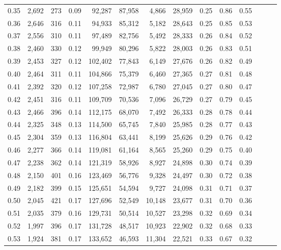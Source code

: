 \begin{tabular}{rrrrrrrrrrrrrr}
0.35 &  2,692 &  273 &  0.09 &   92,287 &   87,958 &   4,866 &  28,959 &  0.25 &  0.86 &      0.55 \\
0.36 &  2,646 &  316 &  0.11 &   94,933 &   85,312 &   5,182 &  28,643 &  0.25 &  0.85 &      0.53 \\
0.37 &  2,556 &  310 &  0.11 &   97,489 &   82,756 &   5,492 &  28,333 &  0.26 &  0.84 &      0.52 \\
0.38 &  2,460 &  330 &  0.12 &   99,949 &   80,296 &   5,822 &  28,003 &  0.26 &  0.83 &      0.51 \\
0.39 &  2,453 &  327 &  0.12 &  102,402 &   77,843 &   6,149 &  27,676 &  0.26 &  0.82 &      0.49 \\
0.40 &  2,464 &  311 &  0.11 &  104,866 &   75,379 &   6,460 &  27,365 &  0.27 &  0.81 &      0.48 \\
0.41 &  2,392 &  320 &  0.12 &  107,258 &   72,987 &   6,780 &  27,045 &  0.27 &  0.80 &      0.47 \\
0.42 &  2,451 &  316 &  0.11 &  109,709 &   70,536 &   7,096 &  26,729 &  0.27 &  0.79 &      0.45 \\
0.43 &  2,466 &  396 &  0.14 &  112,175 &   68,070 &   7,492 &  26,333 &  0.28 &  0.78 &      0.44 \\
0.44 &  2,325 &  348 &  0.13 &  114,500 &   65,745 &   7,840 &  25,985 &  0.28 &  0.77 &      0.43 \\
0.45 &  2,304 &  359 &  0.13 &  116,804 &   63,441 &   8,199 &  25,626 &  0.29 &  0.76 &      0.42 \\
0.46 &  2,277 &  366 &  0.14 &  119,081 &   61,164 &   8,565 &  25,260 &  0.29 &  0.75 &      0.40 \\
0.47 &  2,238 &  362 &  0.14 &  121,319 &   58,926 &   8,927 &  24,898 &  0.30 &  0.74 &      0.39 \\
0.48 &  2,150 &  401 &  0.16 &  123,469 &   56,776 &   9,328 &  24,497 &  0.30 &  0.72 &      0.38 \\
0.49 &  2,182 &  399 &  0.15 &  125,651 &   54,594 &   9,727 &  24,098 &  0.31 &  0.71 &      0.37 \\
0.50 &  2,045 &  421 &  0.17 &  127,696 &   52,549 &  10,148 &  23,677 &  0.31 &  0.70 &      0.36 \\
0.51 &  2,035 &  379 &  0.16 &  129,731 &   50,514 &  10,527 &  23,298 &  0.32 &  0.69 &      0.34 \\
0.52 &  1,997 &  396 &  0.17 &  131,728 &   48,517 &  10,923 &  22,902 &  0.32 &  0.68 &      0.33 \\
0.53 &  1,924 &  381 &  0.17 &  133,652 &   46,593 &  11,304 &  22,521 &  0.33 &  0.67 &      0.32 \\

\end{tabular}
